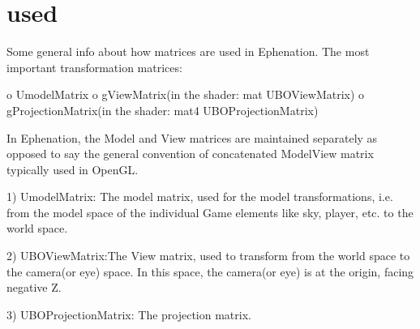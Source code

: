 \hypertarget{index_Matrices}{}\section{used}\label{index_Matrices}
\-Some general info about how matrices are used in \-Ephenation. \-The most important transformation matrices\-:

o \-Umodel\-Matrix o g\-View\-Matrix(in the shader\-: mat U\-B\-O\-View\-Matrix) o g\-Projection\-Matrix(in the shader\-: mat4 U\-B\-O\-Projection\-Matrix)

\-In \-Ephenation, the \-Model and \-View matrices are maintained separately as opposed to say the general convention of concatenated \-Model\-View matrix typically used in \-Open\-G\-L.

1) \-Umodel\-Matrix\-: \-The model matrix, used for the model transformations, i.\-e. from the model space of the individual \-Game elements like sky, player, etc. to the world space.

2) \-U\-B\-O\-View\-Matrix\-:\-The \-View matrix, used to transform from the world space to the camera(or eye) space. \-In this space, the camera(or eye) is at the origin, facing negative \-Z.

3) \-U\-B\-O\-Projection\-Matrix\-: \-The projection matrix. 